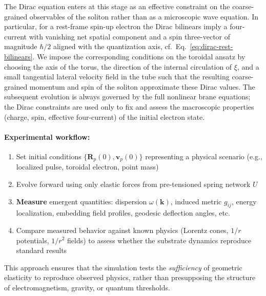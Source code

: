 The Dirac equation enters at this stage as an effective constraint on
the coarse-grained observables of the soliton rather than as a
microscopic wave equation. In particular, for a rest-frame spin-up
electron the Dirac bilinears imply a four-current with vanishing net
spatial component and a spin three-vector of magnitude $\hbar/2$
aligned with the quantization axis, cf.\
Eq.~\eqref{eq:dirac-rest-bilinears}. We impose the corresponding
conditions on the toroidal ansatz by choosing the axis of the torus,
the direction of the internal circulation of $\xi$, and a small
tangential lateral velocity field in the tube such that the resulting
coarse-grained momentum and spin of the soliton approximate these
Dirac values. The subsequent evolution is always governed by the full
nonlinear brane equations; the Dirac constraints are used only to fix
and assess the macroscopic properties (charge, spin, effective
four-current) of the initial electron state.

\paragraph{Experimental workflow:}
\begin{enumerate}
\item Set initial conditions $\{\mathbf{R}_p(0), \mathbf{v}_p(0)\}$ representing a physical scenario (e.g., localized pulse, toroidal electron, point mass)
\item Evolve forward using only elastic forces from pre-tensioned spring network $U$
\item \textbf{Measure} emergent quantities: dispersion $\omega(\mathbf{k})$, induced metric $g_{ij}$, energy localization, embedding field profiles, geodesic deflection angles, etc.
\item Compare measured behavior against known physics (Lorentz cones, $1/r$ potentials, $1/r^2$ fields) to assess whether the substrate dynamics reproduce standard results
\end{enumerate}

This approach ensures that the simulation tests the \emph{sufficiency} of geometric elasticity to reproduce observed physics, rather than presupposing the structure of electromagnetism, gravity, or quantum thresholds.

